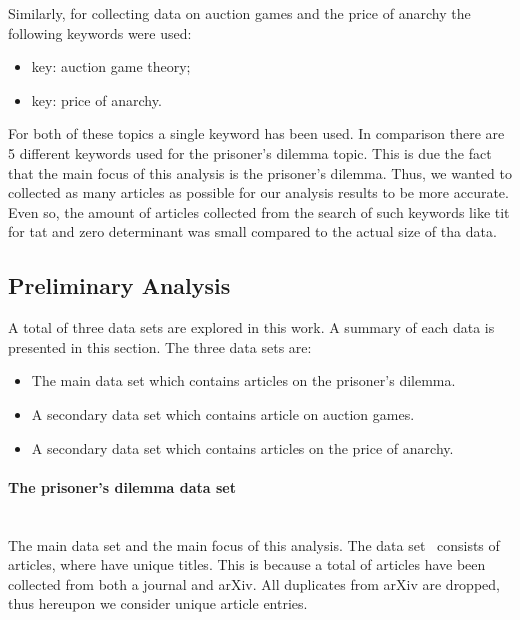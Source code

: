 \documentclass{article}
\theoremstyle{definition}
\newcommand{\totalarticles}{}
\newcommand{\uniquetitles}{}
\newcommand{\numberofduplicates}{}
\begin{document}
Similarly, for collecting data on auction games and the price of anarchy the
following keywords were used:

\begin{itemize}
    \item key: auction game theory;
    \item key: price of anarchy.
\end{itemize}

For both of these topics a single keyword has been used. In comparison there
are 5 different keywords used for the prisoner's dilemma topic. This is due the
fact that the main focus of this analysis is the prisoner's dilemma. Thus, we
wanted to collected as many articles as possible for our analysis results to
be more accurate. Even so, the amount of articles collected from the search
of such keywords like tit for tat and zero determinant was small compared to
the actual size of tha data.
\subsection{Preliminary Analysis}

A total of three data sets are explored in this work. A summary of each data is
presented in this section. The three data sets are:

\begin{itemize}
    \item The main data set which contains articles on the prisoner's dilemma.
    \item A secondary data set which contains article on auction games.
    \item A secondary data set which contains articles on the price of anarchy.
\end{itemize}

\paragraph{The prisoner's dilemma data set}
\mbox{ }\\

The main data set and the main focus of this analysis. The data set~\cite{}
consists of \totalarticles articles, where \uniquetitles have unique titles.
This is because a total of \numberofduplicates articles have been collected from
both a journal and arXiv. All duplicates from arXiv are dropped, thus hereupon
we consider \uniquetitles unique article entries.
\end{document}
